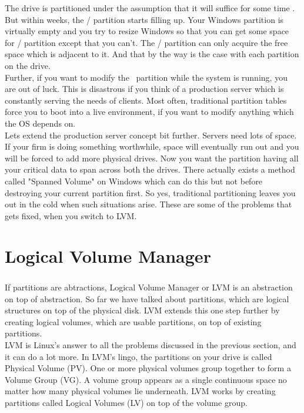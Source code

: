 The drive is partitioned under the assumption that it will suffice for some time
. But within weeks, the / partition starts filling up. Your Windows partition
is virtually empty and you try to resize Windows so that you can get some space
for / partition except that you can't. The / partition can only acquire the
free space which is adjacent to it. And that by the way is the case with each
partition on the drive.\\

Further, if you want to modify the \ partition while the system is running, you
are out of luck. This is disastrous if you think of a production server which is
constantly serving the needs of clients. Most often, traditional partition
tables force you to boot into a live environment, if you want to modify anything
which the OS depends on.\\

Lets extend the production server concept bit further. Servers need lots of
space. If your firm is doing something worthwhile, space will eventually run out
and you will be forced to add more physical drives. Now you want the partition
having all your critical data to span across both the drives. There actually
exists a method called "Spanned Volume" on Windows which can do this but not
before destroying your current partition first. So yes, traditional partitioning
leaves you out in the cold when such situations arise. These are some of the
problems that gets fixed, when you switch to LVM.


\chapter{Logical Volume Manager}
\paragraph{}
If partitions are abtractions, Logical Volume Manager or LVM is an abstraction
on top of abstraction. So far we have talked about partitions, which are
logical structures on top of the physical disk. LVM extends this one step
further by creating logical volumes, which are usable partitions, on top of
existing partitions.\\

LVM is Linux's answer to all the problems discussed in the previous section, and
it can do a lot more. In LVM's lingo, the partitions on your drive is called
Physical Volume (PV). One or more physical volumes group together to form a
Volume Group (VG). A volume group appears as a single continuous space no matter
how many physical volumes lie underneath. LVM works by creating partitions
called Logical Volumes (LV) on top of the volume group.\\

